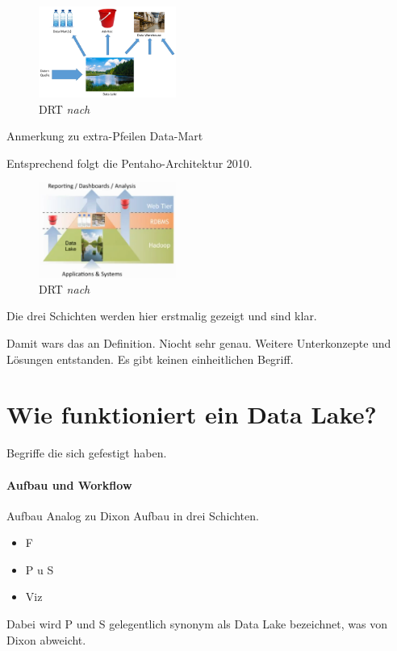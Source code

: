 \documentclass[twoside,twocolumn]{article}
\begin{document}
\begin{figure}[h]
	\centering 
	\includegraphics[width=0.4\textwidth]{img/p2} 
	\caption[DRT]{DRT \textit{nach} \cite{src6}}	
\end{figure}


Anmerkung zu extra-Pfeilen Data-Mart

Entsprechend folgt die Pentaho-Architektur 2010.

\begin{figure}[h]
	\centering 
	\includegraphics[width=0.4\textwidth]{img/p3} 
	\caption[DRT]{DRT \textit{nach} \cite{src6}}	
\end{figure}

Die drei Schichten werden hier erstmalig gezeigt und sind klar.

Damit wars das an Definition. Niocht sehr genau. Weitere Unterkonzepte und Lösungen entstanden. Es gibt keinen einheitlichen Begriff.\cite{src7}

\section{Wie funktioniert ein Data Lake?}
Begriffe die sich gefestigt haben.

\paragraph{Aufbau und Workflow}
Aufbau
Analog zu Dixon Aufbau in drei Schichten.\cite{src8} \cite{src9}
\begin{itemize}
	\item F
	\item P u S
	\item Viz
\end{itemize}
Dabei wird P und S gelegentlich synonym als Data Lake bezeichnet, was von Dixon abweicht.
\end{document}
